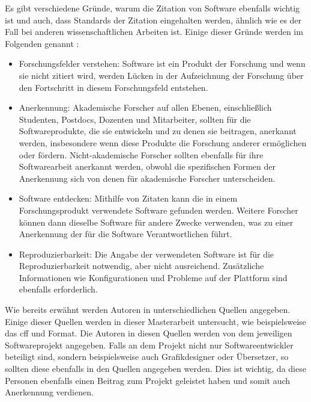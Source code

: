 Es gibt verschiedene Gründe, warum die Zitation von Software ebenfalls wichtig ist und auch, dass Standards der Zitation eingehalten werden, ähnlich wie es der Fall bei anderen wissenschaftlichen Arbeiten ist.
Einige dieser Gründe werden im Folgenden genannt \autocite{smith_software_2016}:

\begin{itemize}
    \item Forschungsfelder verstehen: Software ist ein Produkt der Forschung und wenn sie nicht zitiert wird, werden Lücken in der Aufzeichnung der Forschung über den Fortschritt in diesem Forschungsfeld entstehen.
    \item Anerkennung: Akademische Forscher auf allen Ebenen, einschließlich Studenten, Postdocs, Dozenten und Mitarbeiter, sollten für die Softwareprodukte, die sie entwickeln und zu denen sie beitragen, anerkannt werden, insbesondere wenn diese Produkte die Forschung anderer ermöglichen oder fördern. Nicht-akademische Forscher sollten ebenfalls für ihre Softwarearbeit anerkannt werden, obwohl die spezifischen Formen der Anerkennung sich von denen für akademische Forscher unterscheiden.
    \item Software entdecken: Mithilfe von Zitaten kann die in einem Forschungsprodukt verwendete Software gefunden werden. Weitere Forscher können dann dieselbe Software für andere Zwecke verwenden, was zu einer Anerkennung der für die Software Verantwortlichen führt.
    \item Reproduzierbarkeit: Die Angabe der verwendeten Software ist für die Reproduzierbarkeit notwendig, aber nicht ausreichend. Zusätzliche Informationen wie Konfigurationen und Probleme auf der Plattform sind ebenfalls erforderlich.
\end{itemize}

Wie bereits erwähnt werden Autoren in unterschiedlichen Quellen angegeben.
Einige dieser Quellen werden in dieser Masterarbeit untersucht, wie beispielsweise das \gls{cff} und  Format.
Die Autoren in diesen Quellen werden von dem jeweiligen Softwareprojekt angegeben.
Falls an dem Projekt nicht nur Softwareentwickler beteiligt sind, sondern beispielsweise auch Grafikdesigner oder Übersetzer, so sollten diese ebenfalls in den Quellen angegeben werden.
Dies ist wichtig, da diese Personen ebenfalls einen Beitrag zum Projekt geleistet haben und somit auch Anerkennung verdienen.

